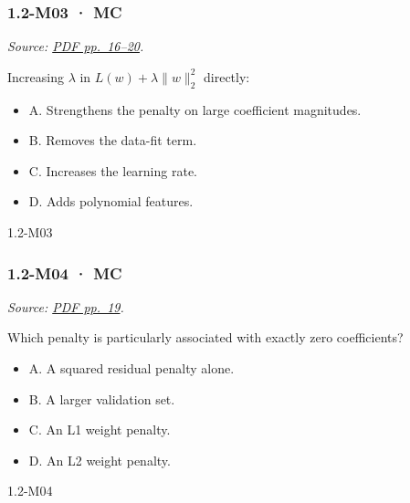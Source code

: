 \noindent\begin{minipage}{\linewidth}

\subsubsection{1.2-M03 · MC}\label{m03-mc-1}

\emph{Source:
\href{../Lecture\%20Slides/1.2.\%20Shallow\%20Learning.pdf\#page=16}{PDF
pp.~16--20}.}

Increasing \(\lambda\) in \(L(w)+\lambda\|w\|_2^2\) directly:

\begin{itemize}
\tightlist
\item
  A. Strengthens the penalty on large coefficient magnitudes.
\item
  B. Removes the data-fit term.
\item
  C. Increases the learning rate.
\item
  D. Adds polynomial features.
\end{itemize}

\begin{solution}[8mm]{1.2-M03}

\end{solution}
\end{minipage}\par\medskip

\noindent\begin{minipage}{\linewidth}

\subsubsection{1.2-M04 · MC}\label{m04-mc-1}

\emph{Source:
\href{../Lecture\%20Slides/1.2.\%20Shallow\%20Learning.pdf\#page=19}{PDF
pp.~19}.}

Which penalty is particularly associated with exactly zero coefficients?

\begin{itemize}
\tightlist
\item
  A. A squared residual penalty alone.
\item
  B. A larger validation set.
\item
  C. An L1 weight penalty.
\item
  D. An L2 weight penalty.
\end{itemize}

\begin{solution}[8mm]{1.2-M04}

\end{solution}
\end{minipage}\par\medskip

